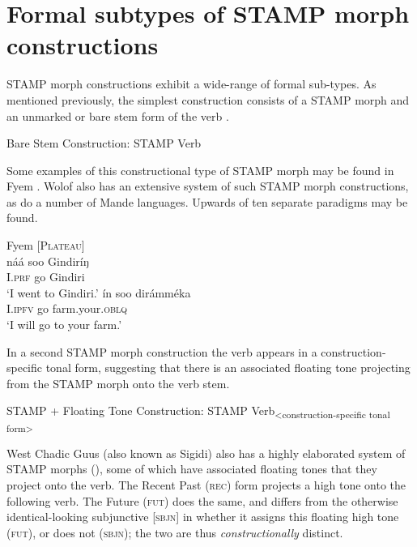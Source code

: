 \documentclass[output=paper]{langsci/langscibook}
\begin{document}
\section{Formal subtypes of STAMP morph constructions}\label{sec:Anderson:4}


STAMP morph constructions exhibit a wide-range of formal sub-types. As mentioned previously, the simplest construction consists of a STAMP morph and an unmarked or bare stem form of the verb .

\ea\label{ex:anderson:10}
Bare Stem Construction:  STAMP  Verb
\z

Some examples of this constructional type of STAMP morph may be found in Fyem . Wolof also has an extensive system of such STAMP morph constructions, as do a number of Mande languages. Upwards of ten separate paradigms may be found.

\ea\label{ex:anderson:11}
\ea\label{ex:anderson:11a}
Fyem \citep[32, 35]{Nettle1998}          \textsc{[Plateau]}\\
\gll   náá  soo  Gindiríŋ    \\
\textsc{I.prf}  go  Gindiri  \\
\glt `I went to Gindiri.'   
\ex \label{ex:anderson:11b}
\gll ín  soo  dirámméka\\
\textsc{I.ipfv}  go  farm.your.\textsc{oblq}\\
\glt `I will go to your farm.'
\z
\z

In a second STAMP morph construction the verb appears in a construction-specific tonal form, suggesting that there is an associated floating tone projecting from the STAMP morph onto the verb stem.

\ea\label{ex:anderson:12}
 STAMP + Floating Tone Construction:   STAMP Verb\textsubscript{<construction-specific tonal form>}  
 \z

West Chadic Guus (also known as Sigidi) also has a highly elaborated system of STAMP morphs (), some of which have associated floating tones that they project onto the verb. The Recent Past (\textsc{rec)} form projects a high tone onto the following verb. The Future (\textsc{fut)} does the same, and differs from the otherwise identical-looking subjunctive [\textsc{sbjn]} in whether it assigns this floating high tone (\textsc{fut}), or does not (\textsc{sbjn}); the two are thus \textit{constructionally} distinct.
\end{document}

